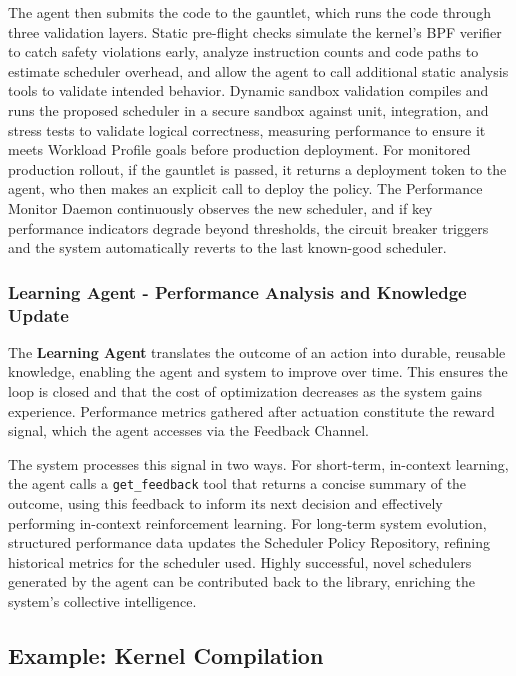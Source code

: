 The agent then submits the code to the gauntlet, which runs the code through three validation layers. Static pre-flight checks simulate the kernel's BPF verifier to catch safety violations early, analyze instruction counts and code paths to estimate scheduler overhead, and allow the agent to call additional static analysis tools to validate intended behavior. Dynamic sandbox validation compiles and runs the proposed scheduler in a secure sandbox against unit, integration, and stress tests to validate logical correctness, measuring performance to ensure it meets Workload Profile goals before production deployment. For monitored production rollout, if the gauntlet is passed, it returns a deployment token to the agent, who then makes an explicit call to deploy the policy. The Performance Monitor Daemon continuously observes the new scheduler, and if key performance indicators degrade beyond thresholds, the circuit breaker triggers and the system automatically reverts to the last known-good scheduler.

\subsubsection{Learning Agent - Performance Analysis and Knowledge Update}

The \textbf{Learning Agent} translates the outcome of an action into durable, reusable knowledge, enabling the agent and system to improve over time. This ensures the loop is closed and that the cost of optimization decreases as the system gains experience. Performance metrics gathered after actuation constitute the reward signal, which the agent accesses via the Feedback Channel.

The system processes this signal in two ways. For short-term, in-context learning, the agent calls a \texttt{get\_feedback} tool that returns a concise summary of the outcome, using this feedback to inform its next decision and effectively performing in-context reinforcement learning. For long-term system evolution, structured performance data updates the Scheduler Policy Repository, refining historical metrics for the scheduler used. Highly successful, novel schedulers generated by the agent can be contributed back to the library, enriching the system's collective intelligence.


\subsection{Example: Kernel Compilation}

